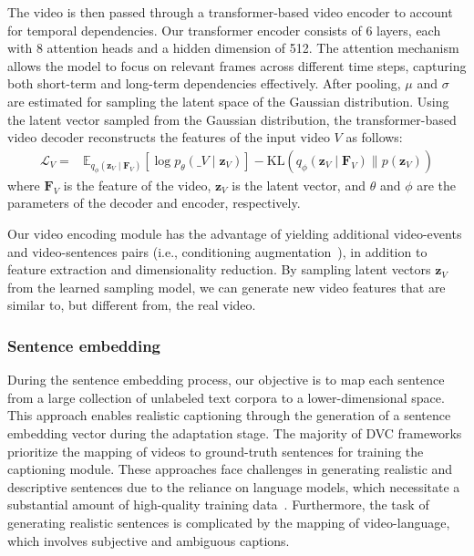 The video is then passed through a transformer-based video encoder to account for temporal dependencies.
Our transformer encoder consists of 6 layers, each with 8 attention heads and a hidden dimension of 512.
The attention mechanism allows the model to focus on relevant frames across different time steps, capturing both short-term and long-term dependencies effectively.
After pooling, $\mu$ and $\sigma$ are estimated for sampling the latent space of the Gaussian distribution.
Using the latent vector sampled from the Gaussian distribution, the transformer-based video decoder reconstructs the features of the input video $V$ as follows:
\begin{equation}
    \begin{aligned}
        \mathcal{L}_V = & \mathbb{E}_{q_\phi(\bm{z}_V \mid \bm{F}_V)}\left[\log p_\theta(\bm_V \mid \bm{z}_V)\right] -\text{KL}\left(q_\phi(\bm{z}_V \mid \bm{F}_V) \| p(\bm{z}_V)\right)
    \end{aligned}
\end{equation}
where $\bm{F}_V$ is the feature of the video, $\bm{z}_V$ is the latent vector, and $\theta$ and $\phi$ are the parameters of the decoder and encoder, respectively.

Our video encoding module has the advantage of yielding additional video-events and video-sentences pairs (i.e., conditioning augmentation~\cite{Zhang2017-jc}), in addition to feature extraction and dimensionality reduction.
By sampling latent vectors $\bm{z}_V$ from the learned sampling model, we can generate new video features that are similar to, but different from, the real video.

\subsubsection{Sentence embedding}
During the sentence embedding process, our objective is to map each sentence from a large collection of unlabeled text corpora to a lower-dimensional space.
This approach enables realistic captioning through the generation of a sentence embedding vector during the adaptation stage.
The majority of DVC frameworks prioritize the mapping of videos to ground-truth sentences for training the captioning module.
These approaches face challenges in generating realistic and descriptive sentences due to the reliance on language models, which necessitate a substantial amount of high-quality training data~\cite{Devlin2019-ld}.
Furthermore, the task of generating realistic sentences is complicated by the mapping of video-language, which involves subjective and ambiguous captions.

